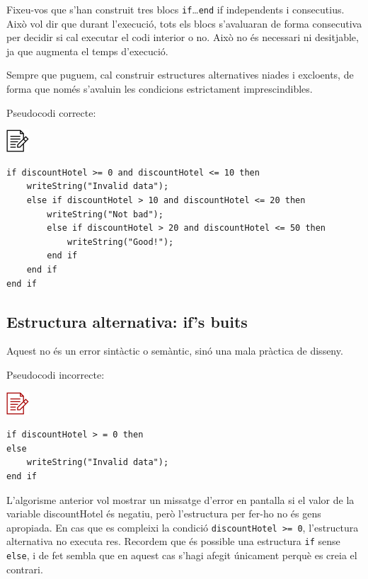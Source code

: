 \documentclass[
]{book}
\begin{document}
Fixeu-vos que s'han construit tres blocs \texttt{if}\ldots{}\texttt{end} if independents i consecutius. Això vol dir que durant l'execució, tots els blocs s'avaluaran de forma consecutiva per decidir si cal executar el codi interior o no. Això no és necessari ni desitjable, ja que augmenta el temps d'execució.

Sempre que puguem, cal construir estructures alternatives niades i excloents, de forma que només s'avaluin les condicions estrictament imprescindibles.

Pseudocodi correcte:

\includegraphics{./img/alg.png}

\begin{verbatim}
if discountHotel >= 0 and discountHotel <= 10 then
    writeString("Invalid data");
    else if discountHotel > 10 and discountHotel <= 20 then
        writeString("Not bad");
        else if discountHotel > 20 and discountHotel <= 50 then
            writeString("Good!");
        end if    
    end if
end if
\end{verbatim}

\hypertarget{estructura-alternativa-ifs-buits}{%
\subsection{Estructura alternativa: if's buits}\label{estructura-alternativa-ifs-buits}}

Aquest no és un error sintàctic o semàntic, sinó una mala pràctica de disseny.

Pseudocodi incorrecte:

\includegraphics{./img/alg_err.png}

\begin{verbatim}
if discountHotel > = 0 then
else
    writeString("Invalid data");
end if
\end{verbatim}

L'algorisme anterior vol mostrar un missatge d'error en pantalla si el valor de la variable discountHotel és negatiu, però l'estructura per fer-ho no és gens apropiada. En cas que es compleixi la condició \texttt{discountHotel\ \textgreater{}=\ 0}, l'estructura alternativa no executa res. Recordem que és possible una estructura \texttt{if} sense \texttt{else}, i de fet sembla que en aquest cas s'hagi afegit únicament perquè es creia el contrari.
\end{document}
